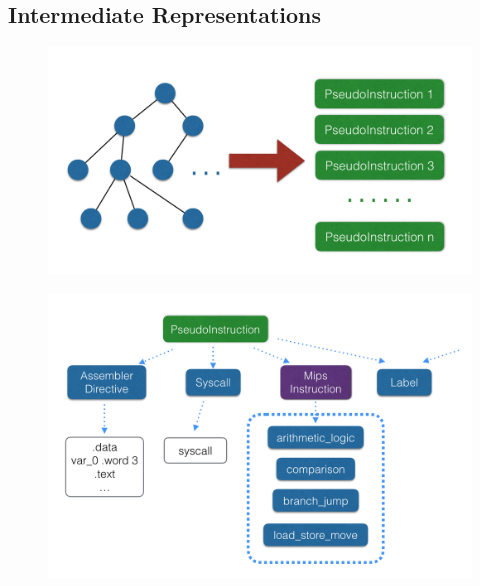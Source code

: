 \documentclass{beamer}
\begin{document}
\subsection{Intermediate Representations}
\begin{frame}
	\begin{figure}
		\centering
		\includegraphics[width = \textwidth]{ir_0}
	\end{figure}
\end{frame}

\begin{frame}
	\begin{figure}
		\centering
		\includegraphics[width = \textwidth]{ir_1}
	\end{figure}
\end{frame}
\end{document}
